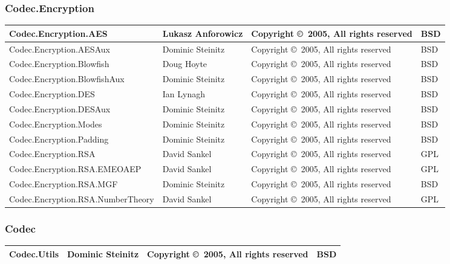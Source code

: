 \documentclass{article}
\begin{document}
\subsubsection{Codec.Encryption}
\begin{tabular}{|p{6cm}|p{3cm}|p{3cm}|p{1cm}|}
\hline\hline
Codec.Encryption.AES & Lukasz Anforowicz &
Copyright \copyright\ 2005, All rights reserved & BSD \\
\hline
Codec.Encryption.AESAux & Dominic Steinitz &
Copyright \copyright\ 2005, All rights reserved & BSD \\
\hline
Codec.Encryption.Blowfish & Doug Hoyte &
Copyright \copyright\ 2005, All rights reserved & BSD \\
\hline
Codec.Encryption.BlowfishAux & Dominic Steinitz &
Copyright \copyright\ 2005, All rights reserved & BSD \\
\hline
Codec.Encryption.DES & Ian Lynagh &
Copyright \copyright\ 2005, All rights reserved & BSD \\
\hline
Codec.Encryption.DESAux & Dominic Steinitz &
Copyright \copyright\ 2005, All rights reserved & BSD \\
\hline
Codec.Encryption.Modes & Dominic Steinitz &
Copyright \copyright\ 2005, All rights reserved & BSD \\
\hline
Codec.Encryption.Padding & Dominic Steinitz &
Copyright \copyright\ 2005, All rights reserved & BSD \\
\hline
Codec.Encryption.RSA & David Sankel &
Copyright \copyright\ 2005, All rights reserved & GPL \\
\hline
Codec.Encryption.RSA.EMEOAEP & David Sankel &
Copyright \copyright\ 2005, All rights reserved & GPL \\
\hline
Codec.Encryption.RSA.MGF & Dominic Steinitz &
Copyright \copyright\ 2005, All rights reserved & BSD \\
\hline
Codec.Encryption.RSA.NumberTheory & David Sankel &
Copyright \copyright\ 2005, All rights reserved & GPL \\
\hline\hline
\end{tabular}

\subsubsection{Codec}
\begin{tabular}{|p{6cm}|p{3cm}|p{3cm}|p{1cm}|}
\hline\hline
Codec.Utils & Dominic Steinitz &
Copyright \copyright\ 2005, All rights reserved & BSD \\
\hline\hline
\end{tabular}
\end{document}
